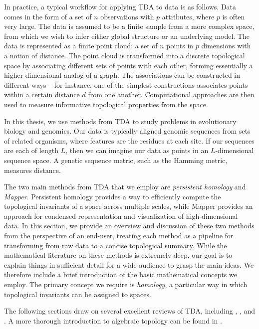 In practice, a typical workflow for applying TDA to data is as follows.
Data comes in the form of a set of $n$ observations with $p$ attributes, where $p$ is often very large.
The data is assumed to be a finite sample from a more complex space, from which we wish to infer either global structure or an underlying model.
The data is represented as a finite point cloud: a set of $n$ points in $p$ dimensions with a notion of distance.
The point cloud is transformed into a discrete topological space by associating different sets of points with each other, forming essentially a higher-dimensional analog of a graph.
The associations can be constructed in different ways -- for instance, one of the simplest constructions associates points within a certain distance $d$ from one another.
Computational approaches are then used to measure informative topological properties from the space.

In this thesis, we use methods from TDA to study problems in evolutionary biology and genomics.
Our data is typically aligned genomic sequences from sets of related organisms, where features are the residues at each site.
If our sequences are each of length $L$, then we can imagine our data as points in an $L$-dimensional sequence space.
A genetic sequence metric, such as the Hamming metric, measures distance.

The two main methods from TDA that we employ are \emph{persistent homology} and \emph{Mapper}.
Persistent homology provides a way to efficiently compute the topological invariants of a space across multiple scales, while Mapper provides an approach for condensed representation and visualization of high-dimensional data.
In this section, we provide an overview and discussion of these two methods from the perspective of an end-user, treating each method as a pipeline for transforming from raw data to a concise topological summary.
While the mathematical literature on these methods is extremely deep, our goal is to explain things in sufficient detail for a wide audience to grasp the main ideas.
We therefore include a brief introduction of the basic mathematical concepts we employ.
The primary concept we require is \emph{homology}, a particular way in which topological invariants can be assigned to spaces.

The following sections draw on several excellent reviews of TDA, including \cite{Carlsson:2009a}, \cite{Edelsbrunner:2010}, and \cite{Ghrist:2008}.
A more thorough introduction to algebraic topology can be found in \cite{Hatcher:2002ut}.

